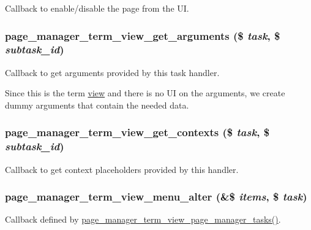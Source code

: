 \label{term__view_8inc_abdfd9eee16a69848fbc2945ef9f503b4}
Callback to enable/disable the page from the UI. \hypertarget{term__view_8inc_a68cce83de72cfa94323c51670b904855}{
\subsubsection[{page\_\-manager\_\-term\_\-view\_\-get\_\-arguments}]{\setlength{\rightskip}{0pt plus 5cm}page\_\-manager\_\-term\_\-view\_\-get\_\-arguments (\$ {\em task}, \/  \$ {\em subtask\_\-id})}}
\label{term__view_8inc_a68cce83de72cfa94323c51670b904855}
Callback to get arguments provided by this task handler.

Since this is the term \hyperlink{classview}{view} and there is no UI on the arguments, we create dummy arguments that contain the needed data. \hypertarget{term__view_8inc_af4d9ba59aff95f20fa52d4a346bb7cbb}{
\subsubsection[{page\_\-manager\_\-term\_\-view\_\-get\_\-contexts}]{\setlength{\rightskip}{0pt plus 5cm}page\_\-manager\_\-term\_\-view\_\-get\_\-contexts (\$ {\em task}, \/  \$ {\em subtask\_\-id})}}
\label{term__view_8inc_af4d9ba59aff95f20fa52d4a346bb7cbb}
Callback to get context placeholders provided by this handler. \hypertarget{term__view_8inc_a13ed5623c41202cca6c55b80580bec5c}{
\subsubsection[{page\_\-manager\_\-term\_\-view\_\-menu\_\-alter}]{\setlength{\rightskip}{0pt plus 5cm}page\_\-manager\_\-term\_\-view\_\-menu\_\-alter (\&\$ {\em items}, \/  \$ {\em task})}}
\label{term__view_8inc_a13ed5623c41202cca6c55b80580bec5c}
Callback defined by \hyperlink{term__view_8inc_a8872873091306758d3592e1c46f8fc1f}{page\_\-manager\_\-term\_\-view\_\-page\_\-manager\_\-tasks()}.

